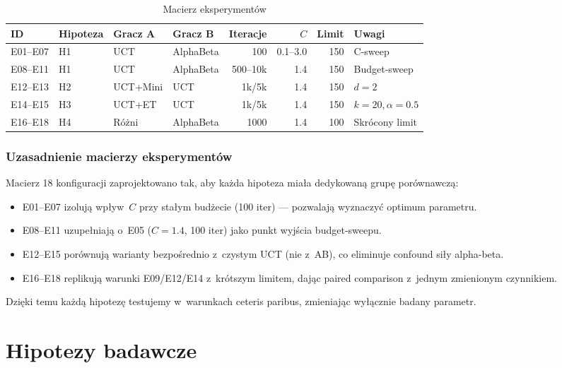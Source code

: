 \documentclass[12pt,a4paper]{article}
\begin{document}
\begin{table}[H]
\centering
\caption{Macierz eksperymentów}
\label{tab:experiments}
\small
\begin{tabular}{llllrrrl}
\toprule
ID & Hipoteza & Gracz A & Gracz B & Iteracje & $C$ & Limit & Uwagi \\
\midrule
E01--E07 & H1 & UCT & AlphaBeta & 100 & 0.1--3.0 & 150 & C-sweep \\
E08--E11 & H1 & UCT & AlphaBeta & 500--10k & 1.4 & 150 & Budget-sweep \\
E12--E13 & H2 & UCT+Mini & UCT & 1k/5k & 1.4 & 150 & $d=2$ \\
E14--E15 & H3 & UCT+ET & UCT & 1k/5k & 1.4 & 150 & $k=20, \alpha=0.5$ \\
E16--E18 & H4 & Różni & AlphaBeta & 1000 & 1.4 & 100 & Skrócony limit \\
\bottomrule
\end{tabular}
\end{table}

\subsubsection{Uzasadnienie macierzy eksperymentów}
Macierz 18 konfiguracji zaprojektowano tak, aby każda hipoteza miała dedykowaną grupę porównawczą:
\begin{itemize}[nosep]
  \item E01--E07 izolują wpływ~$C$ przy stałym budżecie (100 iter) — pozwalają wyznaczyć optimum parametru.
  \item E08--E11 uzupełniają o~E05 ($C=1.4$, 100 iter) jako punkt wyjścia budget-sweepu.
  \item E12--E15 porównują warianty bezpośrednio z~czystym UCT (nie z~AB), co eliminuje confound siły alpha-beta.
  \item E16--E18 replikują warunki E09/E12/E14 z~krótszym limitem, dając paired comparison z~jednym zmienionym czynnikiem.
\end{itemize}
Dzięki temu każdą hipotezę testujemy w~warunkach ceteris paribus, zmieniając wyłącznie badany parametr.

\section{Hipotezy badawcze}
\label{sec:hypotheses}
\end{document}
